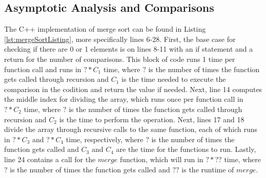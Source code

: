 \documentclass[letterpaper, 10pt,DIV=13]{scrartcl}
\numberwithin{equation}{section} %
\numberwithin{figure}{section} %
\numberwithin{table}{section} %
\begin{document}
\subsection{Asymptotic Analysis and Comparisons}\label{mergeSortAnalysis}
The C++ implementation of merge sort can be found in Listing \ref{lst:mergeSortListing}, more specifically lines 6-28. First, the base case for checking if there are 0 or 1 elements is on lines 8-11 with an if statement and a return for the number of comparisons. This block of code runs 1 time per function call and runs in $? * C_{1}$ time, where $?$ is the number of times the function gets called through recursion and $C_{1}$ is the time needed to execute the comparison in the codition and return the value if needed. Next, line 14 computes the middle index for dividing the array, which runs once per function call in $? * C_{2}$ time, where $?$ is the number of times the function gets called through recursion and $C_{2}$ is the time to perform the operation. Next, lines 17 and 18 divide the array through recursive calls to the same function, each of which runs in $? * C_{3}$ and $? * C_{4}$ time, respectively, where $?$ is the number of times the function gets called and $C_{3}$ and $C_{4}$ are the time for the functions to run. Lastly, line 24 contains a call for the $merge$ function, which will run in $? * ??$ time, where $?$ is the number of times the function gets called and $??$ is the runtime of $merge$.
\end{document}
